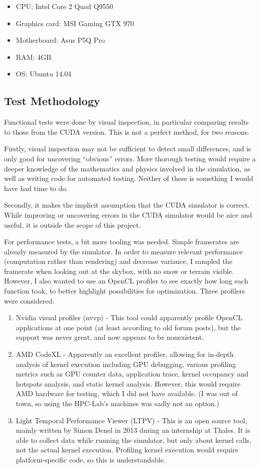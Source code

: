 \begin{itemize}
\item CPU: Intel Core 2 Quad Q9550
\item Graphics card: MSI Gaming GTX 970
\item Motherboard: Asus P5Q Pro
\item RAM: 4GB
\item OS: Ubuntu 14.04
\end{itemize}

\subsection{Test Methodology}
Functional tests were done by visual inspection, in particular comparing results to those from the CUDA version. This is not a perfect method, for two reasons. 

Firstly, visual inspection may not be sufficient to detect small differences, and is only good for uncovering “obvious” errors. More thorough testing would require a deeper knowledge of the mathematics and physics involved in the simulation, as well as writing code for automated testing. Neither of these is something I would have had time to do. 

Secondly, it makes the implicit assumption that the CUDA simulator is correct. While improving or uncovering errors in the CUDA simulator would be nice and useful, it is outside the scope of this project.

For performance tests, a bit more tooling was needed. Simple framerates are already measured by the simulator. In order to measure relevant performance (computation rather than rendering) and decrease variance, I sampled the framerate when looking out at the skybox, with no snow or terrain visible. However, I also wanted to use an OpenCL profiler to see exactly how long each function took, to better highlight possibilities for optimization. Three profilers were considered:

\begin{enumerate}
\item Nvidia visual profiler (nvvp) - This tool could apparently profile OpenCL applications at one point (at least according to old forum posts), but the support was never great, and now appears to be nonexistent.
\item AMD CodeXL - Apparently an excellent profiler, allowing for in-depth analysis of kernel execution including GPU debugging, various profiling metrics such as GPU counter data, application trace, kernel occupancy and hotspots analysis, and static kernel analysis. However, this would require AMD hardware for testing, which I did not have available. (I was out of town, so using the HPC-Lab's machines was sadly not an option.)
\item Light Temporal Performance Viewer (LTPV) - This is an open source tool, mainly written by Simon Denel in 2013 during an internship at Thales. It is able to collect data while running the simulator, but only about kernel calls, not the actual kernel execution. Profiling kernel execution would require platform-specific code, so this is understandable.
\end{enumerate}

